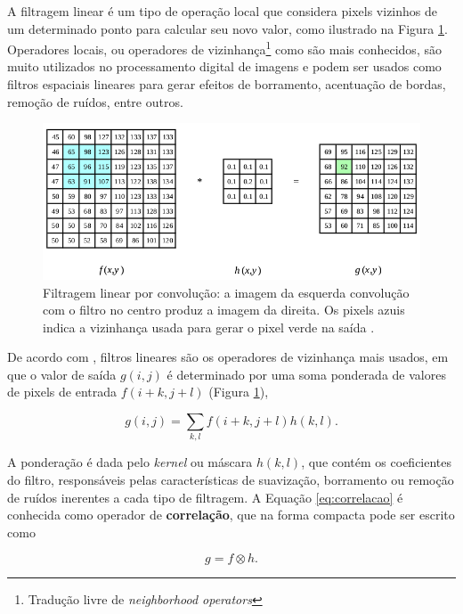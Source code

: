 A filtragem linear é um tipo de operação local que considera pixels vizinhos de um determinado ponto para calcular seu novo valor, como ilustrado na Figura \ref{fig:convolucao}. Operadores locais, ou operadores de vizinhança\footnote{Tradução livre de \textit{neighborhood operators}} como são mais conhecidos, são muito utilizados no processamento digital de imagens e podem ser usados como filtros espaciais lineares para gerar efeitos de borramento, acentuação de bordas, remoção de ruídos, entre outros.

\begin{figure}[ht]
  \begin{center}
    \includegraphics[scale=.58]{imgs/img_convolucao.png}
  \end{center}
  \caption{Filtragem linear por convolução: a imagem da esquerda convolução com o filtro no centro produz a imagem da direita. Os pixels azuis indica a vizinhança usada para gerar o pixel verde na saída \citep{szeliski:2010:book}.}
  \label{fig:convolucao}
\end{figure}

De acordo com \cite{szeliski:2010:book}, filtros lineares são os operadores de vizinhança mais usados, em que o valor de saída $g(i,j)$ é determinado por uma soma ponderada de valores de pixels de entrada $f(i+k,j+l)$ (Figura \ref{fig:convolucao}),

\begin{equation}
  \label{eq:correlacao}
  g(i,j)=\sum_{k,l}f(i+k,j+l)h(k,l)\text{.}
\end{equation}

\noindent A ponderação é dada pelo \textit{kernel} ou máscara $h(k,l)$, que contém os coeficientes do filtro, responsáveis pelas características de suavização, borramento ou remoção de ruídos inerentes a cada tipo de filtragem. A Equação \eqref{eq:correlacao} é conhecida como operador de \textbf{correlação}, que na forma compacta pode ser escrito como

\begin{equation}
  \label{eq:correlacao_compac}
  g=f\otimes h\text{.}
\end{equation}

